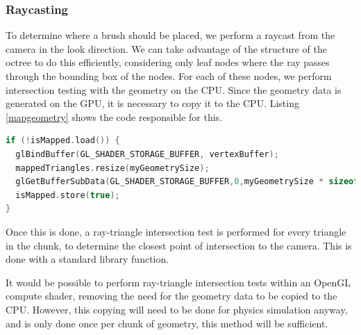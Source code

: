 \documentclass[11pt]{article}
\begin{document}
\subsubsection{Raycasting}
\label{section:raycasting}
To determine where a brush should be placed, we perform a raycast from the camera in the look direction. We can take advantage of the structure of the octree to do this efficiently, considering only leaf nodes where the ray passes through the bounding box of the nodes. For each of these nodes, we perform intersection testing with the geometry on the CPU. Since the geometry data is generated on the GPU, it is necessary to copy it to the CPU. Listing \ref{mapgeometry} shows the code responsible for this.

\begin{lstlisting}[language=C++,label={mapgeometry},caption={Snippet from the procedure \texttt{mapGeometry} to copy geometry data for a chunk from the GPU to the array \texttt{mappedTriangles}. \texttt{isMapped} is an atomic boolean storing whether \texttt{mapGeometry} has already been called for this chunk.}]
if (!isMapped.load()) {
  glBindBuffer(GL_SHADER_STORAGE_BUFFER, vertexBuffer);
  mappedTriangles.resize(myGeometrySize);
  glGetBufferSubData(GL_SHADER_STORAGE_BUFFER,0,myGeometrySize * sizeof(glm::vec4),mappedTriangles.data());
  isMapped.store(true);
}
\end{lstlisting}

Once this is done, a ray-triangle intersection test is performed for every triangle in the chunk, to determine the closest point of intersection to the camera. This is done with a standard library function. 

It would be possible to perform ray-triangle intersection tests within an OpenGL compute shader, removing the need for the geometry data to be copied to the CPU. However, this copying will need to be done for physics simulation anyway, and is only done once per chunk of geometry, this method will be sufficient.
\end{document}
